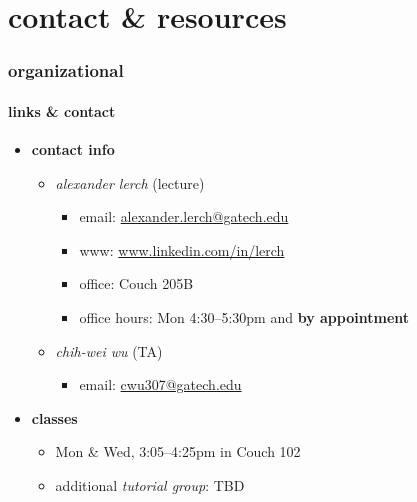 


\subtitle{Part 1: Organizational}


	

    \section[contact]{contact \& resources}
        \begin{frame}\frametitle{organizational}\framesubtitle{links \& contact}
            \begin{itemize}
                \item \textbf{contact info}
                    \begin{itemize}
                        \item   \textit{alexander lerch} (lecture)
                            \begin{itemize}
                                \item   {email}: \url{alexander.lerch@gatech.edu}
                                \item   {www}: \url{www.linkedin.com/in/lerch}
                                \item   {office}: Couch 205B
                                \item   {office hours}:  Mon 4:30--5:30pm and \textbf{by appointment}
                            \end{itemize}
                        \item   \textit{chih-wei wu} (TA)
                            \begin{itemize}
                                \item   email: \url{cwu307@gatech.edu}
                            \end{itemize}
                    \end{itemize}
                
                \smallskip
                \item<2-> \textbf{classes}
                    \begin{itemize}
                        \item   Mon \& Wed, 3:05--4:25pm in Couch 102
                        \pause
                        \item   additional \textit{tutorial group}: TBD
                    \end{itemize}
                

\end{itemize}
\end{frame}
